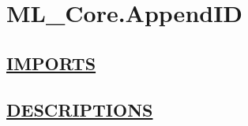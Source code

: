 \chapter*{ML\_Core.AppendID}
\hypertarget{ecldoc:toc:ML_Core.AppendID}{}

\section*{\underline{IMPORTS}}

\section*{\underline{DESCRIPTIONS}}
